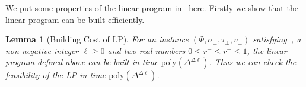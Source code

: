 \documentclass[11pt]{article}
\newtheorem{lemma}[theorem]{Lemma}
\def\poly{\mathrm{poly}}
\newcommand{\qgl}[1]{{\color{purple}{#1}}}
\newcommand{\hktodo}[1]{{\color{blue}{#1}}}
\begin{document}
\hktodo{polish this paragraph}
We put some properties of the linear program in~ here. Firstly we show that the linear program can be built efficiently.
\begin{lemma}[Building Cost of LP] \label{lem:building-cost-of-LP}
    For an instance $(\Phi, \sigma_\bot, \tau_\bot, v_\bot)$ satisfying~, a non-negative integer $\ell \ge 0$ and two real numbers $0 \le r^- \le r^+\leq 1$,
    the linear program defined above can be built in time $\poly\left(\Delta^{\Delta \ell}\right)$. Thus we can check the feasibility of the LP in time $\poly\left(\Delta^{\Delta \ell}\right)$.
\end{lemma}
\end{document}
